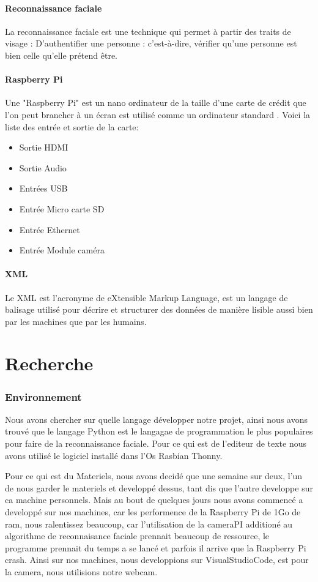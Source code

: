 \documentclass{article}
\begin{document}
\subsection{Reconnaissance faciale}
La reconnaissance faciale est une technique qui permet à partir des traits de visage : D'authentifier une personne : c'est-à-dire, vérifier qu'une personne est bien celle qu'elle prétend être.
\subsection{Raspberry Pi}
Une "Raspberry Pi" est un nano ordinateur de la taille d'une carte de crédit que l'on peut brancher à un écran est utilisé comme un ordinateur standard
. Voici la liste des entrée et sortie de la carte:

\begin{itemize}
    \item Sortie HDMI
    \item Sortie Audio
    \item Entrées USB
    \item Entrée Micro carte SD
    \item Entrée Ethernet
    \item Entrée Module caméra
\end{itemize}

\subsection{XML}
Le XML est l'acronyme de eXtensible Markup Language, est un langage de balisage utilisé pour décrire et structurer des données de manière lisible aussi
bien par les machines que par les humains.


\part{Recherche}

\section{Environnement}

Nous avons chercher sur quelle langage développer notre projet, ainsi nous avons trouvé que le langage Python est le langagae de programmation le plus populaires
pour faire de la reconnaissance faciale. Pour ce qui est de l'editeur de texte nous avons utilisé le logiciel installé
dans l'Os Rasbian Thonny.

Pour ce qui est du Materiels, nous avons decidé que une semaine sur deux, l'un de nous garder le materiels et developpé dessus, tant dis que l'autre developpe
sur ca machine personnels.
Mais au bout de quelques jours nous avons commencé a developpé sur nos machines, car les performence de la Raspberry Pi de 1Go de ram, nous ralentissez beaucoup, car
l'utilisation de la cameraPI additioné au algorithme de reconnaisance faciale prennait beaucoup de ressource, le programme prennait du temps a se lancé et parfois il arrive que la Raspberry Pi crash.
Ainsi sur nos machines,  nous developpions sur VisualStudioCode, est pour la camera, nous utilisions notre webcam.
\end{document}
